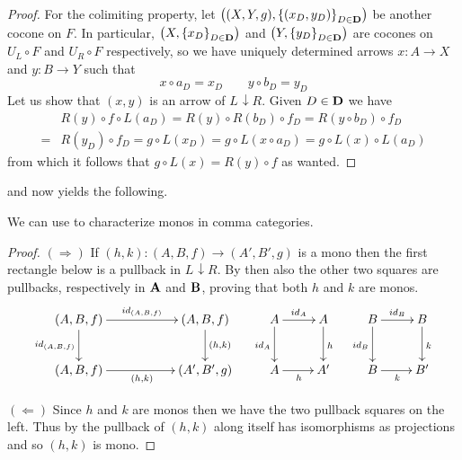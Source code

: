 \documentclass[a4paper,UKenglish,cleveref,pdftex,thm-restate,numberwithinsect]{lipics-v2021}
\def\B{\textbf {\textup{B}}}
\def\D{\textbf {\textup{D}}}
\def\A{\textbf {\textup{A}}}
\newcommand{\comma}[2]{#1\hspace{1pt} {\downarrow}#2}
\newcommand{\id}[1]{\mathsf{id}_{#1}}
\begin{document}
\begin{proof}
	For the colimiting property, let $\left((X, Y, g), \left\{\left(x_D, y_D\right)\right\}_{D\in \D}\right)$ be another cocone on $F$. In particular, $\left(X, \left\{x_D\right\}_{D\in \D}\right)$ and $\left(Y, \left\{y_D\right\}_{D\in \D}\right)$ are cocones on $U_L\circ F$ and $U_R\circ F$ respectively, so we have uniquely determined arrows $x\colon A\rightarrow X$ and $y\colon B\rightarrow Y$ such that 
	\[x\circ a_D= x_D \qquad y\circ b_D= y_D\]
	Let us show that $(x,y)$ is an arrow of $\comma{L}{R}$. Given $D\in \D$ we have
	\begin{align*}
		&R(y)\circ f\circ L(a_D)=R(y)\circ R\left(b_D\right)\circ f_D=R\left(y\circ b_D\right)\circ f_D\\=&R\left(y_D\right)\circ f_D= g\circ L\left(x_D\right)=g\circ L\left(x\circ a_D\right)=g\circ L(x)\circ L\left(a_D\right)
	\end{align*}
	from which it follows  that $g\circ L(x)=R(y)\circ f$ as wanted.
\end{proof} 


 and  now yields the following.

We can use  to characterize monos in comma categories. 
\begin{proof}
	$(\Rightarrow)$  If $(h,k)\colon (A,B,f)\to (A', B', g)$ is a mono then the first rectangle below is a pullback in $\comma{L}{R}$. By  then also the other two squares are pullbacks, respectively in $\A$ and $\B$, proving that both $h$ and $k$ are monos.
	\[\xymatrix{(A, B, f)  \ar[rr]^{\id{(A,B,f)}} \ar[d]_{\id{(A,B,f)}}&& (A, B, f)  \ar[d]^{(h,k)}& A \ar[r]^{\id{A}} \ar[d]_{\id{A}} & A \ar[d]^{h} & B \ar[r]^{\id{B}} \ar[d]_{\id{B}} & B  \ar[d]^{k}\\ (A, B, f)  \ar[rr]_{(h,k)}&& (A', B', g) &A \ar[r]_{h} & A' & B \ar[r]_{k} & B'}\]
	
	\smallskip\noindent 
	\parbox{4cm}{ \xymatrix{A \ar[r]^{\id{A}} \ar[d]_{\id{A}} & A \ar[d]^{h} & B \ar[r]^{\id{B}} \ar[d]_{\id{B}} & B  \ar[d]^{k}\\ A \ar[r]_{h} & A' & B \ar[r]_{k} & B'}}\hfill \parbox{8.5cm}{$(\Leftarrow)$ Since $h$ and $k$ are monos then we have the two pullback squares on the left. Thus by  the pullback of $(h,k)$ along itself has isomorphisms as projections and so $(h,k)$ is mono. \qedhere}
	
\end{proof}
\end{document}
